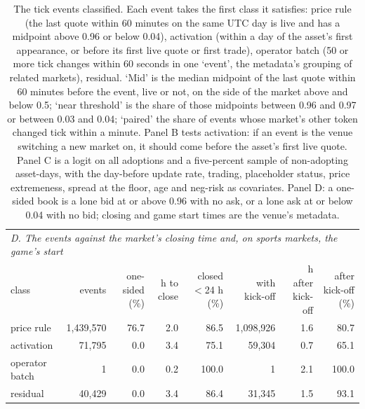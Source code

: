 \begin{table}[htbp]
\begin{tabular}{lrrrrrrr}
\toprule
\multicolumn{8}{l}{\emph{D. The events against the market's closing time and, on sports markets, the game's start}} \\
class & events & one-sided (\%) & h to close & closed $<$24 h (\%) & with kick-off & h after kick-off & after kick-off (\%) \\
\midrule
price rule & 1{,}439{,}570 & 76.7 & 2.0 & 86.5 & 1{,}098{,}926 & 1.6 & 80.7 \\
activation & 71{,}795 & 0.0 & 3.4 & 75.1 & 59{,}304 & 0.7 & 65.1 \\
operator batch & 1 & 0.0 & 0.2 & 100.0 & 1 & 2.1 & 100.0 \\
residual & 40{,}429 & 0.0 & 3.4 & 86.4 & 31{,}345 & 1.5 & 93.1 \\
\bottomrule
\end{tabular}
\caption{The tick events classified. Each event takes the first class it satisfies: price rule (the last quote within 60 minutes on the same UTC day is live and has a midpoint above 0.96 or below 0.04), activation (within a day of the asset's first appearance, or before its first live quote or first trade), operator batch (50 or more tick changes within 60 seconds in one `event', the metadata's grouping of related markets), residual. `Mid' is the median midpoint of the last quote within 60 minutes before the event, live or not, on the side of the market above and below 0.5; `near threshold' is the share of those midpoints between 0.96 and 0.97 or between 0.03 and 0.04; `paired' the share of events whose market's other token changed tick within a minute. Panel B tests activation: if an event is the venue switching a new market on, it should come before the asset's first live quote. Panel C is a logit on all adoptions and a five-percent sample of non-adopting asset-days, with the day-before update rate, trading, placeholder status, price extremeness, spread at the floor, age and neg-risk as covariates. Panel D: a one-sided book is a lone bid at or above 0.96 with no ask, or a lone ask at or below 0.04 with no bid; closing and game start times are the venue's metadata.}
\label{tab:rollout}
\end{table}
